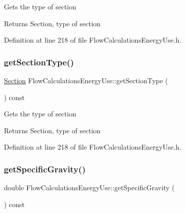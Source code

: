 Gets the type of section

\begin{DoxyReturn}{Returns}
Section, type of section 
\end{DoxyReturn}


Definition at line 218 of file Flow\+Calculations\+Energy\+Use.\+h.

\mbox{\label{class_flow_calculations_energy_use_ae88cc4f93028907c4c12e8925f63266b}} 
\subsubsection{\texorpdfstring{get\+Section\+Type()}{getSectionType()}\hspace{0.1cm}{\footnotesize\ttfamily [3/3]}}
{\footnotesize\ttfamily \hyperlink{class_flow_calculations_energy_use_afbabab0da698748de91369a5dfc7662a}{Section} Flow\+Calculations\+Energy\+Use\+::get\+Section\+Type (\begin{DoxyParamCaption}{ }\end{DoxyParamCaption}) const\hspace{0.3cm}{\ttfamily [inline]}}

Gets the type of section

\begin{DoxyReturn}{Returns}
Section, type of section 
\end{DoxyReturn}


Definition at line 218 of file Flow\+Calculations\+Energy\+Use.\+h.

\mbox{\label{class_flow_calculations_energy_use_adc3ac2406e00a75c33be0a6a66153da3}} 
\subsubsection{\texorpdfstring{get\+Specific\+Gravity()}{getSpecificGravity()}\hspace{0.1cm}{\footnotesize\ttfamily [1/3]}}
{\footnotesize\ttfamily double Flow\+Calculations\+Energy\+Use\+::get\+Specific\+Gravity (\begin{DoxyParamCaption}{ }\end{DoxyParamCaption}) const\hspace{0.3cm}{\ttfamily [inline]}}

